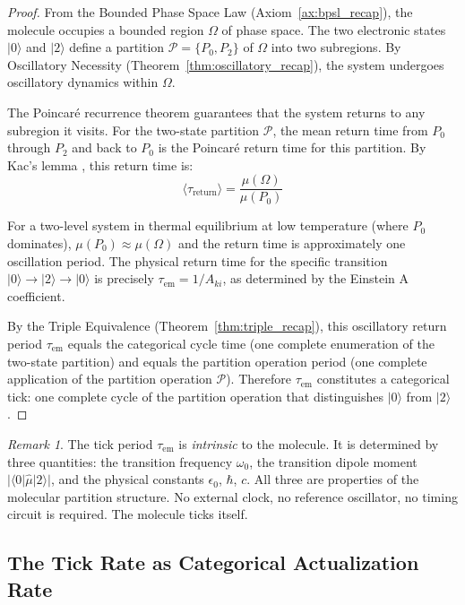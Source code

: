 \documentclass[11pt,a4paper]{article}
\theoremstyle{definition}
\theoremstyle{remark}
\newtheorem{remark}[theorem]{Remark}
\newcommand{\tem}{\tau_{\mathrm{em}}}
\newcommand{\Aki}{A_{ki}}
\begin{document}
\begin{proof}
From the Bounded Phase Space Law (Axiom~\ref{ax:bpsl_recap}), the molecule occupies a bounded region $\Omega$ of phase space. The two electronic states $|0\rangle$ and $|2\rangle$ define a partition $\mathcal{P} = \{P_0, P_2\}$ of $\Omega$ into two subregions. By Oscillatory Necessity (Theorem~\ref{thm:oscillatory_recap}), the system undergoes oscillatory dynamics within $\Omega$.

The Poincar\'{e} recurrence theorem \citep{poincare1890} guarantees that the system returns to any subregion it visits. For the two-state partition $\mathcal{P}$, the mean return time from $P_0$ through $P_2$ and back to $P_0$ is the Poincar\'{e} return time for this partition. By Kac's lemma \citep{kac1947}, this return time is:
\begin{equation}
\langle \tau_{\mathrm{return}} \rangle = \frac{\mu(\Omega)}{\mu(P_0)}
\end{equation}

For a two-level system in thermal equilibrium at low temperature (where $P_0$ dominates), $\mu(P_0) \approx \mu(\Omega)$ and the return time is approximately one oscillation period. The physical return time for the specific transition $|0\rangle \to |2\rangle \to |0\rangle$ is precisely $\tem = 1/\Aki$, as determined by the Einstein A coefficient.

By the Triple Equivalence (Theorem~\ref{thm:triple_recap}), this oscillatory return period $\tem$ equals the categorical cycle time (one complete enumeration of the two-state partition) and equals the partition operation period (one complete application of the partition operation $\mathcal{P}$). Therefore $\tem$ constitutes a categorical tick: one complete cycle of the partition operation that distinguishes $|0\rangle$ from $|2\rangle$.
\end{proof}

\begin{remark}
The tick period $\tem$ is \emph{intrinsic} to the molecule. It is determined by three quantities: the transition frequency $\omega_0$, the transition dipole moment $|\langle 0 | \hat{\mu} | 2 \rangle|$, and the physical constants $\epsilon_0$, $\hbar$, $c$. All three are properties of the molecular partition structure. No external clock, no reference oscillator, no timing circuit is required. The molecule ticks itself.
\end{remark}

\subsection{The Tick Rate as Categorical Actualization Rate}
\end{document}

